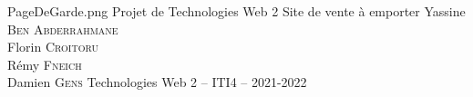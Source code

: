 \documentclass[french,a4paper]{extarticle}
\begin{document}
\PageDeGarde
{PageDeGarde.png}
{Projet de Technologies Web 2} %
{Site de vente à emporter} %
{Yassine \textsc{Ben Abderrahmane}\\
Florin \textsc{Croitoru}\\
Rémy \textsc{Fneich}\\
Damien \textsc{Gens}}
{Technologies Web 2 – ITI4 – 2021-2022} %
 

\tableofcontents 
 
\clearpage 



\end{document}
